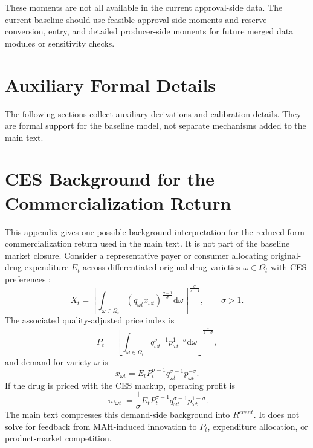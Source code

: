 \documentclass[12pt]{article}
\newcommand{\1}{\mathbf{1}}
\newcommand{\dd}{\mathrm{d}}
\begin{document}
These moments are not all available in the current approval-side data. The current baseline should use feasible approval-side moments and reserve conversion, entry, and detailed producer-side moments for future merged data modules or sensitivity checks.

\clearpage
\section{Auxiliary Formal Details}

The following sections collect auxiliary derivations and calibration details. They are formal support for the baseline model, not separate mechanisms added to the main text.
\section{CES Background for the Commercialization Return}
\label{sec:ces_appendix}

This appendix gives one possible background interpretation for the reduced-form commercialization return used in the main text. It is not part of the baseline market closure. Consider a representative payer or consumer allocating original-drug expenditure $E_t$ across differentiated original-drug varieties $\omega\in\Omega_t$ with CES preferences \citep{DixitStiglitz1977,Melitz2003}:
\begin{equation}
    X_t
    =
    \left[
    \int_{\omega\in\Omega_t}
    \left(q_{\omega t}x_{\omega t}\right)^{\frac{\sigma-1}{\sigma}}
    \dd\omega
    \right]^{\frac{\sigma}{\sigma-1}},
    \qquad \sigma>1.
    \label{eq:ces_utility}
\end{equation}
The associated quality-adjusted price index is
\begin{equation}
    P_t
    =
    \left[
    \int_{\omega\in\Omega_t}
    q_{\omega t}^{\sigma-1}p_{\omega t}^{1-\sigma}
    \dd\omega
    \right]^{\frac{1}{1-\sigma}},
    \label{eq:ces_price_index}
\end{equation}
and demand for variety $\omega$ is
\begin{equation}
    x_{\omega t}
    =
    E_tP_t^{\sigma-1}q_{\omega t}^{\sigma-1}p_{\omega t}^{-\sigma}.
    \label{eq:ces_demand}
\end{equation}
If the drug is priced with the CES markup, operating profit is
\begin{equation}
    \varpi_{\omega t}
    =
    \frac{1}{\sigma}
    E_tP_t^{\sigma-1}q_{\omega t}^{\sigma-1}p_{\omega t}^{1-\sigma}.
    \label{eq:ces_profit}
\end{equation}
The main text compresses this demand-side background into $R^{event}$. It does not solve for feedback from MAH-induced innovation to $P_t$, expenditure allocation, or product-market competition.
\end{document}
